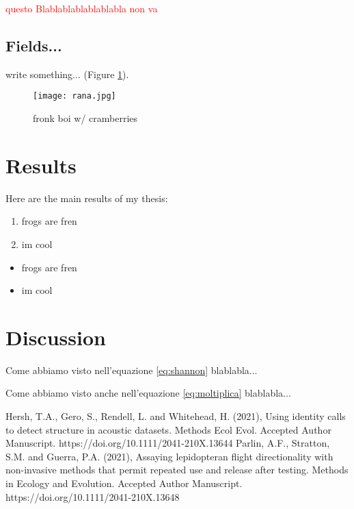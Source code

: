 \documentclass[a4paper, 12pt]{article}
\newcommand{\rosso}{\textcolor{red}} %
\begin{document}
\rosso{questo Blablablablablablabla non va} %
\subsection{Fields...}
write something... (Figure \ref{fig:fronk}).
\begin{figure}

    \centering
    \texttt{[image: rana.jpg]}
    \caption{fronk boi w/ cramberries}
    \label{fig:fronk}
\end{figure}

\section{Results}
Here are the main results of my thesis:
\begin{enumerate}
    \item frogs are fren
    \item im cool
\end{enumerate}
\begin{itemize}
    \item frogs are fren
    \item im cool
\end{itemize}
\section{Discussion}
Come abbiamo visto nell'equazione \ref{eq:shannon} blablabla...

Come abbiamo visto anche nell'equazione \ref{eq:moltiplica} blablabla...
\begin{thebibliography}{9000}
%
Hersh, T.A., Gero, S., Rendell, L. and Whitehead, H. (2021), Using identity calls to detect structure in acoustic datasets. Methods Ecol Evol. Accepted Author Manuscript. https://doi.org/10.1111/2041-210X.13644
%
Parlin, A.F., Stratton, S.M. and Guerra, P.A. (2021), Assaying lepidopteran flight directionality with non-invasive methods that permit repeated use and release after testing. Methods in Ecology and Evolution. Accepted Author Manuscript. https://doi.org/10.1111/2041-210X.13648
%

\end{thebibliography}
\end{document}
